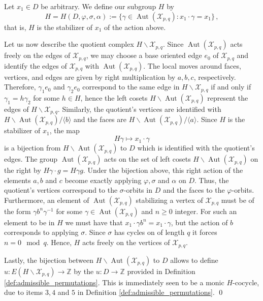 \documentclass[11pt]{article}
\theoremstyle{remark}
\newcommand{\cX}{\mathcal X}
\newcommand{\Z}{\mathbb Z}
\begin{document}
Let $x_1\in D$ be arbitrary. We define our subgroup $H$ by
\[
  H = H(D,\varphi,\sigma,\alpha) :=\{\gamma\in\operatorname{Aut}(\cX_{p,q}):x_1\cdot\gamma=x_1\} \, ,
\]
that is, $H$ is the stabilizer of $x_1$ of the action above.  

Let us now describe the quotient complex $H\backslash \mathcal X_{p,q}$. Since $\operatorname{Aut}(\cX_{p,q})$ acts freely on the edges of $\cX_{p,q}$, we may choose a base
oriented edge $e_0$ of $\mathcal X_{p,q}$ and identify the edges of $\cX_{p,q}$ with $\operatorname{Aut}(\cX_{p,q})$. The local moves around faces, vertices, and edges are given by right multiplication by
$a,b,c$, respectively. Therefore, $\gamma_1 e_0$ and $\gamma_2 e_0$ correspond to the same edge in $H\backslash \mathcal X_{p,q}$ if and only if $\gamma_1 = h\gamma_2$ for some $h\in H$, hence the left cosets $H\backslash\operatorname{Aut}(\cX_{p,q})$ represent the edges of $H\backslash \mathcal X_{p,q}$. Similarly, the quotient's vertices are identified with $H\backslash \operatorname{Aut}(\cX_{p,q})/\langle  b \rangle$ and the faces are $H\backslash \operatorname{Aut}(\cX_{p,q})/\langle a \rangle$. 
Since $H$ is the stabilizer of $x_1$, the map 
\[
  H\gamma\longmapsto x_1\cdot\gamma
\]
is a bijection from $H\backslash\operatorname{Aut}(\cX_{p,q})$ to $D$ which is identified with the quotient's edges. The group $\operatorname{Aut}(\cX_{p,q})$ acts on the set of left cosets $H \backslash \operatorname{Aut}(\cX_{p,q})$ on the right by $H\gamma \cdot g = H \gamma g$. 
Under the bijection above, this right action of the elements $a,b$ and $c$ become exactly applying $\varphi, \sigma$ and $\alpha$ on $D$. Thus, the quotient's vertices correspond to the $\sigma$-orbits in $D$ and the faces to the $\varphi$-orbits. Furthermore, an element of $\operatorname{Aut}(\cX_{p,q})$ stabilizing a vertex of $\mathcal X_{p,q}$ must be of the form $\gamma  b^n \gamma^{-1}$ for some $\gamma \in \operatorname{Aut}(\cX_{p,q})$ and $n\geq 0$ integer. For such an element to be in $H$ we must have that $x_1 \cdot \gamma b^n = x_1 \cdot \gamma$, but the action of $b$ corresponds to applying $\sigma$. Since $\sigma$ has cycles on of length $q$ it forces $n=0 \mod q$. Hence, $H$ acts freely on the vertices of $\mathcal X_{p,q}$. %

Lastly, the bijection between $H \backslash \operatorname{Aut}(\cX_{p,q})$ to $D$ allows to define $u:E(H\backslash \mathcal X_{p,q})\to \Z$ by the $u:D\to\Z$ provided in Definition \ref{def:admissible_permutations}. This is immediately seen to be a monic $H$-cocycle, due to items $3,4$ and $5$ in Definition \ref{def:admissible_permutations}.
\qed
\end{document}
